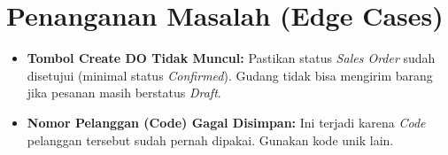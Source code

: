 \section{Penanganan Masalah (Edge Cases)}
\begin{itemize}
    \item \textbf{Tombol Create DO Tidak Muncul:} Pastikan status \textit{Sales Order} sudah disetujui (minimal status \textit{Confirmed}). Gudang tidak bisa mengirim barang jika pesanan masih berstatus \textit{Draft}.
    \item \textbf{Nomor Pelanggan (Code) Gagal Disimpan:} Ini terjadi karena \textit{Code} pelanggan tersebut sudah pernah dipakai. Gunakan kode unik lain.
\end{itemize}
